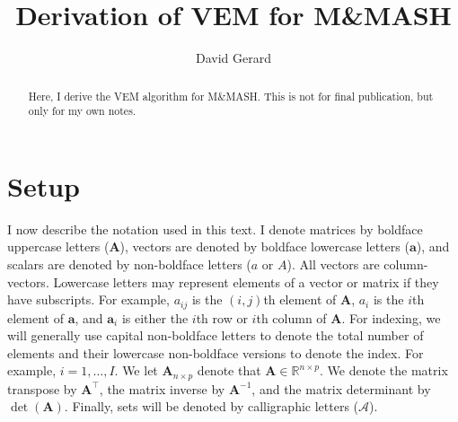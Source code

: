 \documentclass[11pt,authoryear]{article}
\newcommand{\bs}[1]{\boldsymbol{#1}}
\begin{document}
\singlespacing
\title{Derivation of VEM for M\&MASH}
\author{David Gerard}
\maketitle

\begin{abstract}
  Here, I derive the VEM algorithm for M\&MASH. This is not for final
  publication, but only for my own notes.
\end{abstract}

\section{Setup}
\label{section:setup}

I now describe the notation used in this text. I denote matrices by
boldface uppercase letters ($\bs{A}$), vectors are denoted by boldface
lowercase letters ($\bs{a}$), and scalars are denoted by non-boldface
letters ($a$ or $A$). All vectors are column-vectors. Lowercase
letters may represent elements of a vector or matrix if they have
subscripts. For example, $a_{ij}$ is the $(i,j)$th element of
$\bs{A}$, $a_i$ is the $i$th element of $\bs{a}$, and $\bs{a}_{i}$ is
either the $i$th row or $i$th column of $\bs{A}$. For indexing, we
will generally use capital non-boldface letters to denote the total
number of elements and their lowercase non-boldface versions to denote
the index. For example, $i = 1,\ldots,I$. We let $\bs{A}_{n \times p}$
denote that $\bs{A} \in \mathbb{R}^{n \times p}$. We denote the matrix
transpose by $\bs{A}^\intercal$, the matrix inverse by $\bs{A}^{-1}$,
and the matrix determinant by $\det(\bs{A})$. Finally, sets will be
denoted by calligraphic letters ($\mathcal{A}$).
\end{document}
